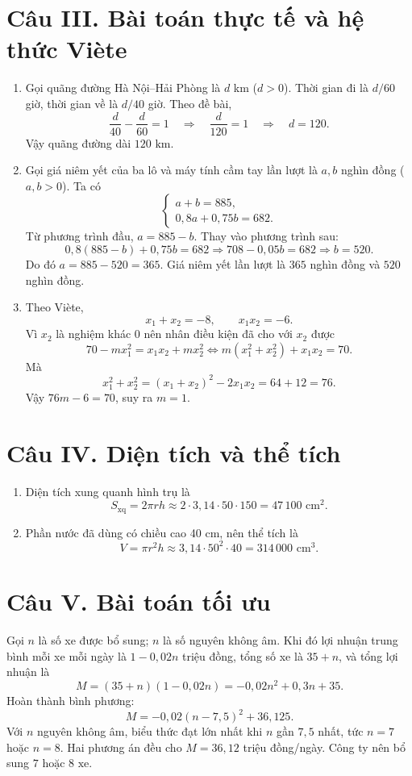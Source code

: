 \documentclass[12pt,a4paper]{article}
\begin{document}
\section*{Câu III. Bài toán thực tế và hệ thức Viète}
\begin{enumerate}
\item Gọi quãng đường Hà Nội--Hải Phòng là $d$ km ($d>0$). Thời gian đi là $d/60$ giờ, thời gian về là $d/40$ giờ. Theo đề bài,
\[
\frac d{40}-\frac d{60}=1\quad\Longrightarrow\quad \frac d{120}=1\quad\Longrightarrow\quad d=120.
\]
Vậy quãng đường dài $\boxed{120\text{ km}}$.
\item Gọi giá niêm yết của ba lô và máy tính cầm tay lần lượt là $a,b$ nghìn đồng ($a,b>0$). Ta có
\[
\begin{cases}
a+b=885,\\
0{,}8a+0{,}75b=682.
\end{cases}
\]
Từ phương trình đầu, $a=885-b$. Thay vào phương trình sau:
\[
0{,}8(885-b)+0{,}75b=682
\Longrightarrow 708-0{,}05b=682
\Longrightarrow b=520.
\]
Do đó $a=885-520=365$. Giá niêm yết lần lượt là $\boxed{365}$ nghìn đồng và $\boxed{520}$ nghìn đồng.
\item Theo Viète,
\[
x_1+x_2=-8,\qquad x_1x_2=-6.
\]
Vì $x_2$ là nghiệm khác 0 nên nhân điều kiện đã cho với $x_2$ được
\[
70-mx_1^2=x_1x_2+mx_2^2
\Longleftrightarrow m(x_1^2+x_2^2)+x_1x_2=70.
\]
Mà
\[
x_1^2+x_2^2=(x_1+x_2)^2-2x_1x_2=64+12=76.
\]
Vậy $76m-6=70$, suy ra $\boxed{m=1}$.
\end{enumerate}

\section*{Câu IV. Diện tích và thể tích}
\begin{enumerate}
\item Diện tích xung quanh hình trụ là
\[
S_{\text{xq}}=2\pi rh\approx2\cdot3{,}14\cdot50\cdot150=47\,100\text{ cm}^2.
\]
\item Phần nước đã dùng có chiều cao 40 cm, nên thể tích là
\[
V=\pi r^2h\approx3{,}14\cdot50^2\cdot40=314\,000\text{ cm}^3.
\]
\end{enumerate}

\section*{Câu V. Bài toán tối ưu}
Gọi $n$ là số xe được bổ sung; $n$ là số nguyên không âm. Khi đó lợi nhuận trung bình mỗi xe mỗi ngày là $1-0{,}02n$ triệu đồng, tổng số xe là $35+n$, và tổng lợi nhuận là
\[
M=(35+n)(1-0{,}02n)=-0{,}02n^2+0{,}3n+35.
\]
Hoàn thành bình phương:
\[
M=-0{,}02(n-7{,}5)^2+36{,}125.
\]
Với $n$ nguyên không âm, biểu thức đạt lớn nhất khi $n$ gần $7{,}5$ nhất, tức $n=7$ hoặc $n=8$. Hai phương án đều cho $M=36{,}12$ triệu đồng/ngày. Công ty nên bổ sung $\boxed{7\text{ hoặc }8\text{ xe}}$.
\end{document}
